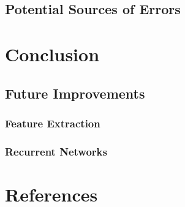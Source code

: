 \documentclass[12pt]{article}
\begin{document}
\subsection{Potential Sources of Errors}

\section{Conclusion}

\subsection{Future Improvements}

\subsubsection{Feature Extraction}

\subsubsection{Recurrent Networks}


\section{References}
\end{document}
